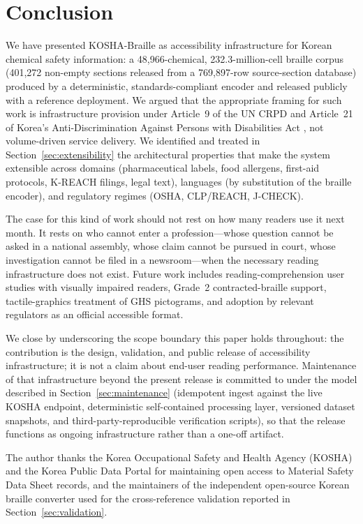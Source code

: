 \documentclass[smallextended]{svjour3}
\begin{document}
\section{Conclusion}
\label{sec:conclusion}

We have presented KOSHA-Braille as accessibility infrastructure for Korean chemical safety information: a 48{,}966-chemical, 232.3-million-cell braille corpus (401{,}272 non-empty sections released from a 769{,}897-row source-section database) produced by a deterministic, standards-compliant encoder and released publicly with a reference deployment. We argued that the appropriate framing for such work is infrastructure provision under Article~9 of the UN CRPD \cite{crpd} and Article~21 of Korea's Anti-Discrimination Against Persons with Disabilities Act \cite{kdpa}, not volume-driven service delivery. We identified and treated in Section~\ref{sec:extensibility} the architectural properties that make the system extensible across domains (pharmaceutical labels, food allergens, first-aid protocols, K-REACH filings, legal text), languages (by substitution of the braille encoder), and regulatory regimes (OSHA, CLP/REACH, J-CHECK).

The case for this kind of work should not rest on how many readers use it next month. It rests on who cannot enter a profession---whose question cannot be asked in a national assembly, whose claim cannot be pursued in court, whose investigation cannot be filed in a newsroom---when the necessary reading infrastructure does not exist. Future work includes reading-comprehension user studies with visually impaired readers, Grade~2 contracted-braille support, tactile-graphics treatment of GHS pictograms, and adoption by relevant regulators as an official accessible format.

We close by underscoring the scope boundary this paper holds throughout: the contribution is the design, validation, and public release of accessibility infrastructure; it is not a claim about end-user reading performance. Maintenance of that infrastructure beyond the present release is committed to under the model described in Section~\ref{sec:maintenance} (idempotent ingest against the live KOSHA endpoint, deterministic self-contained processing layer, versioned dataset snapshots, and third-party-reproducible verification scripts), so that the release functions as ongoing infrastructure rather than a one-off artifact.

\begin{acknowledgements}
The author thanks the Korea Occupational Safety and Health Agency (KOSHA) and the Korea Public Data Portal for maintaining open access to Material Safety Data Sheet records, and the maintainers of the independent open-source Korean braille converter \cite{hangul_braille_converter} used for the cross-reference validation reported in Section~\ref{sec:validation}.
\end{acknowledgements}
\end{document}
